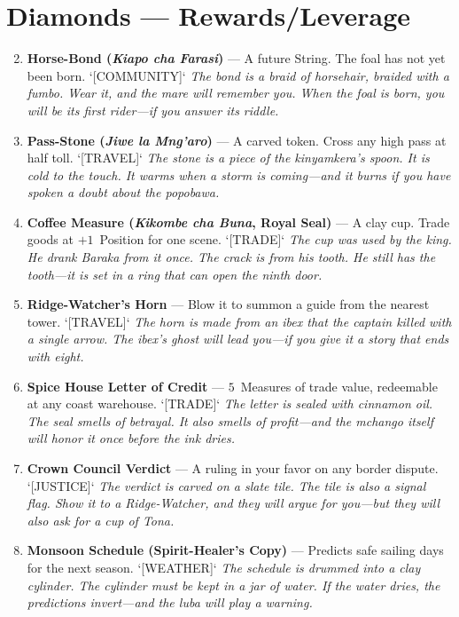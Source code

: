 \section*{Diamonds --- Rewards/Leverage}
\label{sec:taharka-rewards}
\begin{enumerate}
\setcounter{enumi}{1}
\item \textbf{Horse-Bond (\textit{Kiapo cha Farasi})} --- A future String. The foal has not yet been born. `[COMMUNITY]`
  \hfill \textit{The bond is a braid of horsehair, braided with a \textit{fumbo}. Wear it, and the mare will remember you. When the foal is born, you will be its first rider---if you answer its riddle.}
\item \textbf{Pass-Stone (\textit{Jiwe la Mng'aro})} --- A carved token. Cross any high pass at half toll. `[TRAVEL]`
  \hfill \textit{The stone is a piece of the \textit{kinyamkera}'s spoon. It is cold to the touch. It warms when a storm is coming---and it burns if you have spoken a doubt about the \textit{popobawa}.}
\item \textbf{Coffee Measure (\textit{Kikombe cha Buna}, Royal Seal)} --- A clay cup. Trade goods at $+1$~Position for one scene. `[TRADE]`
  \hfill \textit{The cup was used by the king. He drank \textit{Baraka} from it once. The crack is from his tooth. He still has the tooth---it is set in a ring that can open the ninth door.}
\item \textbf{Ridge-Watcher's Horn} --- Blow it to summon a guide from the nearest tower. `[TRAVEL]`
  \hfill \textit{The horn is made from an ibex that the captain killed with a single arrow. The ibex's ghost will lead you---if you give it a story that ends with eight.}
\item \textbf{Spice House Letter of Credit} --- $5$~Measures of trade value, redeemable at any coast warehouse. `[TRADE]`
  \hfill \textit{The letter is sealed with cinnamon oil. The seal smells of betrayal. It also smells of profit---and the \textit{mchango} itself will honor it once before the ink dries.}
\item \textbf{Crown Council Verdict} --- A ruling in your favor on any border dispute. `[JUSTICE]`
  \hfill \textit{The verdict is carved on a slate tile. The tile is also a signal flag. Show it to a Ridge-Watcher, and they will argue for you---but they will also ask for a cup of \textit{Tona}.}
\item \textbf{Monsoon Schedule (Spirit-Healer's Copy)} --- Predicts safe sailing days for the next season. `[WEATHER]`
  \hfill \textit{The schedule is drummed into a clay cylinder. The cylinder must be kept in a jar of water. If the water dries, the predictions invert---and the \textit{luba} will play a warning.}

\end{enumerate}
